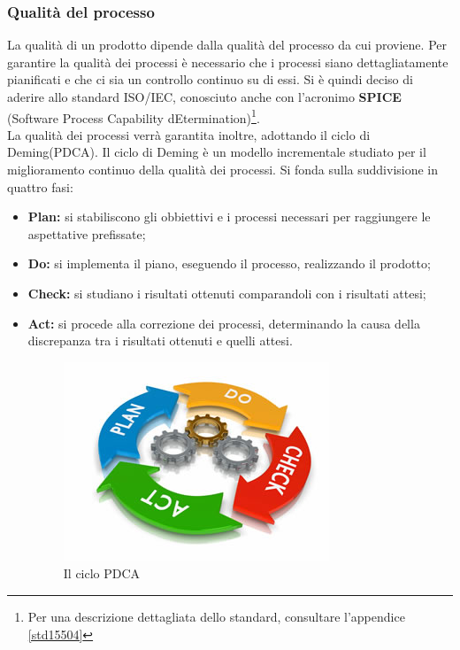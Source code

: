 \subsubsection{Qualità del processo}
La qualità di un prodotto dipende dalla qualità del processo da cui proviene. Per garantire la qualità dei processi è  necessario che i processi siano dettagliatamente pianificati e che ci sia un controllo continuo su di essi. Si è quindi deciso di aderire allo standard ISO\glossario /IEC, conosciuto anche con l'acronimo \textbf{SPICE} (Software Process Capability dEtermination)\footnote{Per una descrizione dettagliata dello standard, 
consultare l'appendice \ref{std15504}}.
\\La qualità dei processi verrà garantita inoltre, adottando il ciclo di Deming\glossario(PDCA). Il ciclo di Deming è un modello incrementale studiato per il miglioramento continuo della qualità dei processi. Si fonda sulla suddivisione in quattro fasi:
\begin{itemize}
	\item \textbf{Plan:} si stabiliscono gli obbiettivi e i processi necessari per raggiungere le aspettative prefissate;
	\item \textbf{Do:} si implementa il piano, eseguendo il processo, realizzando il prodotto;
	\item \textbf{Check:} si studiano i risultati ottenuti comparandoli con i risultati attesi;
	\item \textbf{Act:} si procede alla correzione dei processi, determinando la causa della discrepanza tra i risultati ottenuti e quelli attesi.
	\begin{figure}[!h]
		\centering
		\includegraphics[scale=1.8]{./content/Immagini/PDCA}
		\caption{Il ciclo PDCA}
	\end{figure}
\end{itemize}